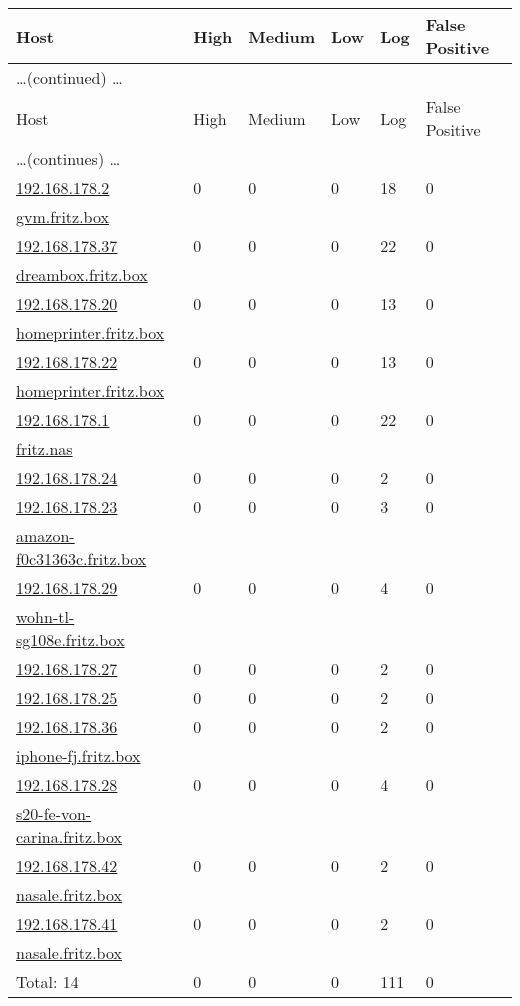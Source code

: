 \documentclass{article}
\begin{document}
\begin{longtable}{|l|l|l|l|l|l|}
\hline
\rowcolor{gvm_report}Host&High&Medium&Low&Log&False Positive\\
\hline
\endfirsthead
\multicolumn{6}{l}{\hfill\ldots (continued) \ldots}\\
\hline
\rowcolor{gvm_report}Host&High&Medium&Low&Log&False Positive\\
\hline
\endhead
\hline
\multicolumn{6}{l}{\ldots (continues) \ldots}\\
\endfoot
\hline
\endlastfoot
\hline
\hyperref[host:192.168.178.2]{192.168.178.2}&0&0&0&18&0\\
\hyperref[host:192.168.178.2]{gvm.fritz.box}&&&&&\\
\hline
\hyperref[host:192.168.178.37]{192.168.178.37}&0&0&0&22&0\\
\hyperref[host:192.168.178.37]{dreambox.fritz.box}&&&&&\\
\hline
\hyperref[host:192.168.178.20]{192.168.178.20}&0&0&0&13&0\\
\hyperref[host:192.168.178.20]{homeprinter.fritz.box}&&&&&\\
\hline
\hyperref[host:192.168.178.22]{192.168.178.22}&0&0&0&13&0\\
\hyperref[host:192.168.178.22]{homeprinter.fritz.box}&&&&&\\
\hline
\hyperref[host:192.168.178.1]{192.168.178.1}&0&0&0&22&0\\
\hyperref[host:192.168.178.1]{fritz.nas}&&&&&\\
\hline
\hyperref[host:192.168.178.24]{192.168.178.24}&0&0&0&2&0\\
\hline
\hyperref[host:192.168.178.23]{192.168.178.23}&0&0&0&3&0\\
\hyperref[host:192.168.178.23]{amazon-f0c31363c.fritz.box}&&&&&\\
\hline
\hyperref[host:192.168.178.29]{192.168.178.29}&0&0&0&4&0\\
\hyperref[host:192.168.178.29]{wohn-tl-sg108e.fritz.box}&&&&&\\
\hline
\hyperref[host:192.168.178.27]{192.168.178.27}&0&0&0&2&0\\
\hline
\hyperref[host:192.168.178.25]{192.168.178.25}&0&0&0&2&0\\
\hline
\hyperref[host:192.168.178.36]{192.168.178.36}&0&0&0&2&0\\
\hyperref[host:192.168.178.36]{iphone-fj.fritz.box}&&&&&\\
\hline
\hyperref[host:192.168.178.28]{192.168.178.28}&0&0&0&4&0\\
\hyperref[host:192.168.178.28]{s20-fe-von-carina.fritz.box}&&&&&\\
\hline
\hyperref[host:192.168.178.42]{192.168.178.42}&0&0&0&2&0\\
\hyperref[host:192.168.178.42]{nasale.fritz.box}&&&&&\\
\hline
\hyperref[host:192.168.178.41]{192.168.178.41}&0&0&0&2&0\\
\hyperref[host:192.168.178.41]{nasale.fritz.box}&&&&&\\
\hline
\hline
Total: 14&0&0&0&111&0\\
\hline
\end{longtable}
\end{document}
